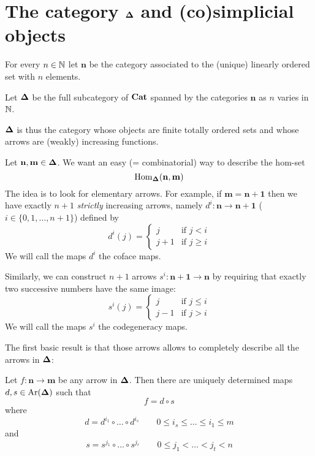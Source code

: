 \section{The category $\mathbf \Delta$ and (co)simplicial objects}

\begin{notation}
For every $n \in \mathbb{N}$ let $\mathbf n$ be the category associated to the (unique) linearly ordered set with $n$ elements.
\end{notation}

\begin{defin}
Let $\mathbf \Delta$ be the full subcategory of $\mathbf{Cat}$ spanned by the categories $\mathbf n$ as $n$ varies in $\mathbb{N}$.
\end{defin}

\begin{rmk}
$\mathbf \Delta$ is thus the category whose objects are finite totally ordered sets and whose arrows are (weakly) increasing functions.
\end{rmk}

Let $\mathbf n, \mathbf m \in \mathbf \Delta$. We want an easy (= combinatorial) way to describe the hom-set
\[
\mathrm{Hom}_{\mathbf \Delta}(\mathbf n, \mathbf m)
\]
The idea is to look for elementary arrows. For example, if $\mathbf m = \mathbf{n+1}$ then we have exactly $n+1$ \emph{strictly} increasing arrows, namely $d^i \colon \mathbf n \to \mathbf{n+1}$ ($i \in \{0,1,\ldots,n+1\}$) defined by
\[
d^i(j) = \begin{cases} j & \text{if } j < i \\ j + 1 & \text{if } j \ge i \end{cases}
\]
We will call the maps $d^i$ the coface maps.

Similarly, we can construct $n+1$ arrows $s^i \colon \mathbf{n+1} \to \mathbf n$ by requiring that exactly two successive numbers have the same image:
\[
s^i(j) = \begin{cases} j & \text{if } j \le i \\ j - 1 & \text{if } j > i \end{cases}
\]
We will call the maps $s^i$ the codegeneracy maps.

The first basic result is that those arrows allows to completely describe all the arrows in $\mathbf \Delta$:

\begin{thm} \label{thm factorization epi-mono for Delta}
Let $f \colon \mathbf n \to \mathbf m$ be any arrow in $\mathbf \Delta$. Then there are uniquely determined maps $d,s \in \mathrm{Ar}(\mathbf \Delta)$ such that
\[
f = d \circ s
\]
where
\begin{equation} \label{eq increasing part}
d = d^{i_1} \circ \ldots \circ d^{i_s} \qquad 0 \le i_s \le \ldots \le i_1 \le m
\end{equation}
and
\begin{equation} \label{eq decreasing part}
s = s^{j_1} \circ \ldots \circ s^{j_r} \qquad 0 \le j_1 < \ldots < j_t < n
\end{equation}
\end{thm}

